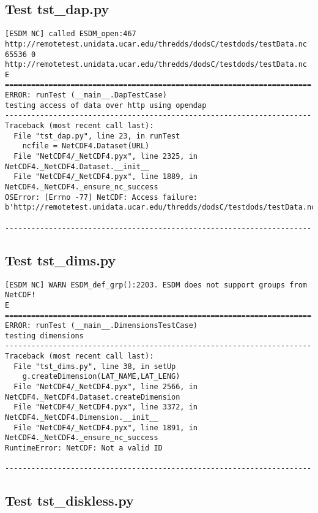 \subsection{Test tst\_dap.py}

\begin{verbatim}
[ESDM NC] called ESDM_open:467 http://remotetest.unidata.ucar.edu/thredds/dodsC/testdods/testData.nc 65536 0 http://remotetest.unidata.ucar.edu/thredds/dodsC/testdods/testData.nc
E
======================================================================
ERROR: runTest (__main__.DapTestCase)
testing access of data over http using opendap
----------------------------------------------------------------------
Traceback (most recent call last):
  File "tst_dap.py", line 23, in runTest
    ncfile = NetCDF4.Dataset(URL)
  File "NetCDF4/_NetCDF4.pyx", line 2325, in NetCDF4._NetCDF4.Dataset.__init__
  File "NetCDF4/_NetCDF4.pyx", line 1889, in NetCDF4._NetCDF4._ensure_nc_success
OSError: [Errno -77] NetCDF: Access failure: b'http://remotetest.unidata.ucar.edu/thredds/dodsC/testdods/testData.nc'

----------------------------------------------------------------------
\end{verbatim}

\subsection{Test tst\_dims.py}

\begin{verbatim}
[ESDM NC] WARN ESDM_def_grp():2203. ESDM does not support groups from NetCDF!
E
======================================================================
ERROR: runTest (__main__.DimensionsTestCase)
testing dimensions
----------------------------------------------------------------------
Traceback (most recent call last):
  File "tst_dims.py", line 38, in setUp
    g.createDimension(LAT_NAME,LAT_LENG)
  File "NetCDF4/_NetCDF4.pyx", line 2566, in NetCDF4._NetCDF4.Dataset.createDimension
  File "NetCDF4/_NetCDF4.pyx", line 3372, in NetCDF4._NetCDF4.Dimension.__init__
  File "NetCDF4/_NetCDF4.pyx", line 1891, in NetCDF4._NetCDF4._ensure_nc_success
RuntimeError: NetCDF: Not a valid ID

----------------------------------------------------------------------
\end{verbatim}

\subsection{Test tst\_diskless.py}

